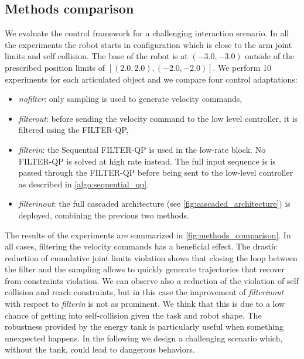 \subsection{Methods comparison}
We evaluate the control framework for a challenging interaction scenario. In all the experiments the robot starts in configuration which is close to the arm joint limits and self collision. The base of the robot is at $(-3.0, -3.0)$ outside of the prescribed position limits of $[(2.0, 2.0), (-2.0, -2.0)]$. We perform 10 experiments for each articulated object and we compare four control adaptations:
\begin{itemize}
    \item \textit{no\textunderscore filter}: only sampling is used to generate velocity commands,
    \item \textit{filter\textunderscore out}: before sending the velocity command to the low level controller, it is filtered using the FILTER-QP,
    \item \textit{filter\textunderscore in}: the Sequential FILTER-QP is used in the low-rate block. No FILTER-QP is solved at high rate instead. The full input sequence is  is passed through the FILTER-QP before being sent to the low-level controller as described in \algo \ref{algo:sequential_qp}.
    \item \textit{filter\textunderscore in\textunderscore out}: the full cascaded architecture (see \fig \ref{fig:cascaded_architecture}) is deployed, combining the previous two methods.
\end{itemize}
The results of the experiments are summarized in \fig \ref{fig:methods_comparison}. In all cases, filtering the velocity commands has a beneficial effect. The drastic reduction of cumulative joint limits violation shows that closing the loop between the filter and the sampling allows to quickly generate trajectories that recover from constraints violation. We can observe also a reduction of the violation of self collision and reach constraints, but in this case the improvement of  \textit{filter\textunderscore in\textunderscore out} with respect to \textit{filter\textunderscore in} is not as prominent. We think that this is due to a low chance of getting into self-collision given the task and robot shape. The robustness provided by the energy tank is particularly useful when something unexpected happens. In the following we design a challenging scenario which, without the tank, could lead to dangerous behaviors. 
